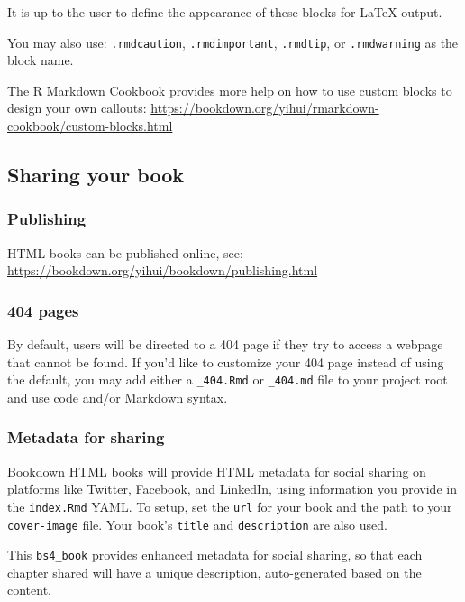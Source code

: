 \documentclass[
]{bxjsbook}
\theoremstyle{definition}
\theoremstyle{definition}
\theoremstyle{definition}
\theoremstyle{definition}
\theoremstyle{remark}
\begin{document}
It is up to the user to define the appearance of these blocks for LaTeX output.

You may also use: \texttt{.rmdcaution}, \texttt{.rmdimportant}, \texttt{.rmdtip}, or \texttt{.rmdwarning} as the block name.

The R Markdown Cookbook provides more help on how to use custom blocks to design your own callouts: \url{https://bookdown.org/yihui/rmarkdown-cookbook/custom-blocks.html}

\hypertarget{sharing-your-book}{%
\subsection{Sharing your book}\label{sharing-your-book}}

\hypertarget{publishing}{%
\subsubsection{Publishing}\label{publishing}}

HTML books can be published online, see: \url{https://bookdown.org/yihui/bookdown/publishing.html}

\hypertarget{pages}{%
\subsubsection{404 pages}\label{pages}}

By default, users will be directed to a 404 page if they try to access a webpage that cannot be found. If you'd like to customize your 404 page instead of using the default, you may add either a \texttt{\_404.Rmd} or \texttt{\_404.md} file to your project root and use code and/or Markdown syntax.

\hypertarget{metadata-for-sharing}{%
\subsubsection{Metadata for sharing}\label{metadata-for-sharing}}

Bookdown HTML books will provide HTML metadata for social sharing on platforms like Twitter, Facebook, and LinkedIn, using information you provide in the \texttt{index.Rmd} YAML. To setup, set the \texttt{url} for your book and the path to your \texttt{cover-image} file. Your book's \texttt{title} and \texttt{description} are also used.

This \texttt{bs4\_book} provides enhanced metadata for social sharing, so that each chapter shared will have a unique description, auto-generated based on the content.
\end{document}
